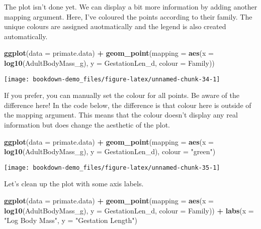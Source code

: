 \documentclass[]{book}
\newenvironment{Shaded}{\begin{snugshade}}{\end{snugshade}}
\newcommand{\KeywordTok}[1]{\textcolor[rgb]{0.13,0.29,0.53}{\textbf{#1}}}
\newcommand{\DataTypeTok}[1]{\textcolor[rgb]{0.13,0.29,0.53}{#1}}
\newcommand{\StringTok}[1]{\textcolor[rgb]{0.31,0.60,0.02}{#1}}
\newcommand{\OperatorTok}[1]{\textcolor[rgb]{0.81,0.36,0.00}{\textbf{#1}}}
\newcommand{\NormalTok}[1]{#1}
\begin{document}
The plot isn't done yet. We can display a bit more information by adding
another mapping argument. Here, I've coloured the points according to
their family. The unique colours are assigned auotmatically and the
legend is also created automatically.

\begin{Shaded}
\begin{Highlighting}[]
\KeywordTok{ggplot}\NormalTok{(}\DataTypeTok{data =}\NormalTok{ primate.data) }\OperatorTok{+}
\StringTok{  }\KeywordTok{geom_point}\NormalTok{(}\DataTypeTok{mapping =} \KeywordTok{aes}\NormalTok{(}\DataTypeTok{x =} \KeywordTok{log10}\NormalTok{(AdultBodyMass_g), }\DataTypeTok{y =}\NormalTok{ GestationLen_d, }
                           \DataTypeTok{colour =}\NormalTok{ Family))}
\end{Highlighting}
\end{Shaded}

\begin{center}\texttt{[image: bookdown-demo\_files/figure-latex/unnamed-chunk-34-1]} \end{center}

If you prefer, you can manually set the colour for all points. Be aware
of the difference here! In the code below, the difference is that colour
here is outside of the mapping argument. This means that the colour
doesn't display any real information but does change the aesthetic of
the plot.

\begin{Shaded}
\begin{Highlighting}[]
\KeywordTok{ggplot}\NormalTok{(}\DataTypeTok{data =}\NormalTok{ primate.data) }\OperatorTok{+}
\StringTok{  }\KeywordTok{geom_point}\NormalTok{(}\DataTypeTok{mapping =} \KeywordTok{aes}\NormalTok{(}\DataTypeTok{x =} \KeywordTok{log10}\NormalTok{(AdultBodyMass_g), }\DataTypeTok{y =}\NormalTok{ GestationLen_d),}
             \DataTypeTok{colour =} \StringTok{"green"}\NormalTok{)}
\end{Highlighting}
\end{Shaded}

\begin{center}\texttt{[image: bookdown-demo\_files/figure-latex/unnamed-chunk-35-1]} \end{center}

Let's clean up the plot with some axis labels.

\begin{Shaded}
\begin{Highlighting}[]
\KeywordTok{ggplot}\NormalTok{(}\DataTypeTok{data =}\NormalTok{ primate.data) }\OperatorTok{+}
\StringTok{  }\KeywordTok{geom_point}\NormalTok{(}\DataTypeTok{mapping =} \KeywordTok{aes}\NormalTok{(}\DataTypeTok{x =} \KeywordTok{log10}\NormalTok{(AdultBodyMass_g), }\DataTypeTok{y =}\NormalTok{ GestationLen_d,}
                           \DataTypeTok{colour =}\NormalTok{ Family)) }\OperatorTok{+}
\StringTok{  }\KeywordTok{labs}\NormalTok{(}\DataTypeTok{x =} \StringTok{"Log Body Mass"}\NormalTok{, }\DataTypeTok{y =} \StringTok{"Gestation Length"}\NormalTok{)}
\end{Highlighting}
\end{Shaded}
\end{document}
